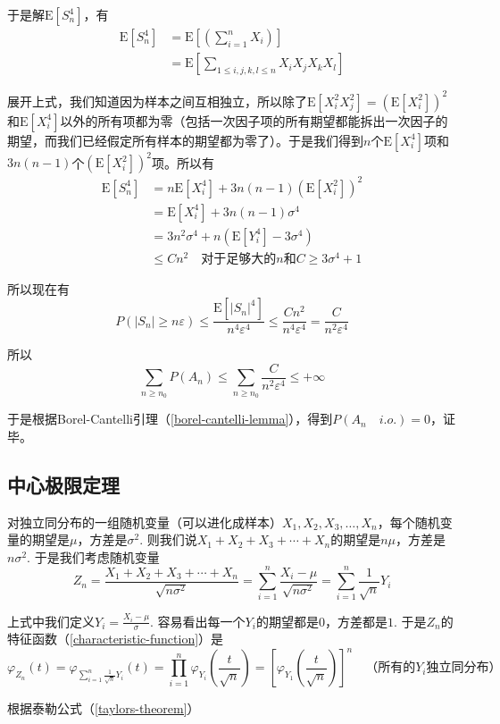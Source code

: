 \documentclass[UTF8]{ctexbook}
\begin{document}
于是解$\mathrm E[S_n^4]$，有
\begin{align*}
	\mathrm E[S_n^4]&=\mathrm E\left[\left(\sum_{i=1}^nX_i\right)\right] \\
	&=\mathrm E\left[\sum_{1\leq i,j,k,l\leq n}X_iX_jX_kX_l\right]
\end{align*}

展开上式，我们知道因为样本之间互相独立，所以除了$\mathrm E[X_i^2X_j^2]=(\mathrm E[X_i^2])^2$和$\mathrm E[X_i^4]$以外的所有项都为零（包括一次因子项的所有期望都能拆出一次因子的期望，而我们已经假定所有样本的期望都为零了）。于是我们得到$n$个$\mathrm E[X_i^4]$项和$3n(n-1)$个$(\mathrm E[X_i^2])^2$项。所以有
\begin{align*}
	\mathrm E[S_n^4]&=n\mathrm E[X_i^4]+3n(n-1)(\mathrm E[X_i^2])^2\\
	&=\mathrm E[X_i^4]+3n(n-1)\sigma^4 \\
	&=3n^2\sigma^4+n(\mathrm E[Y_i^4]-3\sigma^4) \\
	&\leq Cn^2\quad\text{对于足够大的$n$和$C\geq3\sigma^4+1$}
\end{align*}

所以现在有
\[
	P\left(|S_n|\geq n\varepsilon\right)\leq\frac{\mathrm E[|S_n|^4]}{n^4\varepsilon^4}\leq\frac{Cn^2}{n^4\varepsilon^4}=\frac{C}{n^2\varepsilon^4}
\]

所以
\[
	\sum_{n\geq n_0}P(A_n)\leq\sum_{n\geq n_0}\frac{C}{n^2\varepsilon^4}\leq+\infty
\]

于是根据Borel-Cantelli引理（\ref{borel-cantelli-lemma}），得到$P(A_n\quad i.o.)=0$，证毕。
\subsection{中心极限定理}
\label{CLT-proof}
对独立同分布的一组随机变量（可以进化成样本）$X_1,X_2,X_3,\dots,X_n$，每个随机变量的期望是$\mu$，方差是$\sigma^2$. 则我们说$X_1+X_2+X_3+\cdots+X_n$的期望是$n\mu$，方差是$n\sigma^2$. 于是我们考虑随机变量
\[
	Z_n=\frac{X_1+X_2+X_3+\cdots+X_n}{\sqrt{n\sigma^2}}=\sum_{i=1}^n\frac{X_i-\mu}{\sqrt{n\sigma^2}}=\sum_{i=1}^n\frac{1}{\sqrt n}Y_i
\]

上式中我们定义$Y_i=\frac{X_i-\mu}{\sigma}$. 容易看出每一个$Y_i$的期望都是$0$，方差都是$1$. 于是$Z_n$的特征函数（\ref{characteristic-function}）是
\[
	\varphi_{Z_n}(t)=\varphi_{\sum_{i=1}^n\frac{1}{\sqrt n}Y_i}(t)=\prod_{i=1}^n\varphi_{Y_i}\left(\frac{t}{\sqrt n}\right)=\left[\varphi_{Y_1}\left(\frac{t}{\sqrt n}\right)\right]^n\quad\text{（所有的$Y_i$独立同分布）}
\]

根据泰勒公式（\ref{taylors-theorem}）
\end{document}
